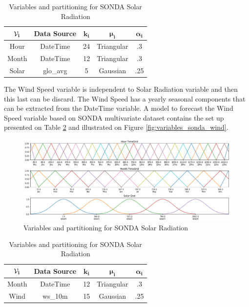 \begin{table}[htb]
    \centering
    \begin{tabular}{|c|c|c|c|c|} \hline
        $\mathbf{\mathcal{V}_i}$ & \textbf{Data Source} & $\mathbf{k_i}$ & $\mathbf{\mu_i}$ & $\mathbf{\alpha_i}$  \\ \hline
        Hour & DateTime & 24 & Triangular & .3 \\ \hline 
        Month & DateTime & 12 & Triangular & .3 \\ \hline 
        Solar & glo\_avg & 5 & Gaussian & .25 \\ \hline 
    \end{tabular}
    \caption{Variables and partitioning for SONDA Solar Radiation}
    \label{tab:variables_sonda_solar}
\end{table}

The Wind Speed variable is independent to Solar Radiation variable and then this last can be discard. The Wind Speed has a yearly seasonal components that can be extracted from the DateTime variable.  A model to forecast the Wind Speed variable based on SONDA  multivariate dataset contains the set up presented on Table \ref{tab:variables_sonda_wind} and illustrated on Figure \ref{fig:variables_sonda_wind}.

\begin{figure}[htb]
    \centering
    \includegraphics[width=\textwidth]{figures/variables_sonda_solar.png}
    \caption{Variables and partitioning for SONDA Solar Radiation}
    \label{fig:variables_sonda_solar}
\end{figure}

\begin{table}[htb]
    \centering
    \begin{tabular}{|c|c|c|c|c|} \hline
        $\mathbf{\mathcal{V}_i}$ & \textbf{Data Source} & $\mathbf{k_i}$ & $\mathbf{\mu_i}$ & $\mathbf{\alpha_i}$  \\ \hline
        Month & DateTime & 12 & Triangular & .3 \\ \hline 
        Wind & ws\_10m & 15 & Gaussian & .25 \\ \hline 
    \end{tabular}
    \caption{Variables and partitioning for SONDA Solar Radiation}
    \label{tab:variables_sonda_wind}
\end{table}

